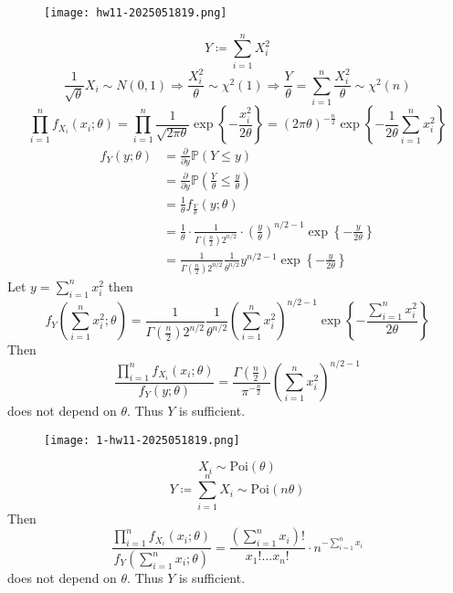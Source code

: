 \begin{exercise}
\begin{figure}[H]
\centering
\texttt{[image: hw11-2025051819.png]}
\label{}
\end{figure}
\end{exercise}
\[
Y\coloneqq \sum_{i=1}^{n} X_i^2
\]
\[
\frac{1}{\sqrt{ \theta }}X_i\sim N(0,1)\Rightarrow\frac{X_i^2}{\theta}\sim \chi^{2}(1)\Rightarrow \frac{Y}{\theta}=\sum_{i=1}^{n} \frac{X_i^2}{\theta}\sim \chi^{2}(n)
\]
\[
\prod_{i=1}^{n} f_{X_i}(x_i;\theta)=\prod_{i=1}^{n} \frac{1}{\sqrt{ 2\pi\theta }}\exp \left\{  -\frac{x_i^2}{2\theta}  \right\}=(2\pi\theta)^{-\frac{n}{2}}\exp \left\{  -\frac{1}{2\theta}\sum_{i=1}^{n} x_i^2  \right\}
\]
\[
\begin{aligned}
f_{Y}(y;\theta) & =\frac{ \partial   }{ \partial y } \mathbb{P}(Y\leq y) \\
 & =\frac{ \partial   }{ \partial y } \mathbb{P}\left( \frac{Y}{\theta}\leq \frac{y}{\theta} \right) \\
 & =\frac{1}{\theta}f_{\frac{Y}{\theta}}(y;\theta) \\
 & =\frac{1}{\theta}\cdot\frac{1}{\Gamma\left( \frac{n}{2} \right)2^{n/2}}\cdot \left( \frac{y}{\theta} \right)^{n/2-1}\exp \left\{  -\frac{y}{2\theta}  \right\} \\
 & =\frac{1}{\Gamma\left( \frac{n}{2} \right)2^{n/2 }}\frac{1}{\theta^{n/2 }}y^{n/2-1 }\exp \left\{  -\frac{y}{2\theta}  \right\}
\end{aligned}
\]
Let $y=\sum_{i=1}^{n}x_i^2$ then
\[
f_{Y}\left( \sum_{i=1}^{n} x_i^2 ;\theta\right)=\frac{1}{\Gamma\left( \frac{n}{2} \right)2^{n/2 }}\frac{1}{\theta^{n/2 }}\left( \sum_{i=1}^{n} x_i^2  \right)^{n/2-1 }\exp \left\{  -\frac{\sum_{i=1}^{n} x_i^2}{2\theta}  \right\}
\]
Then
\[
\frac{\prod_{i=1}^{n} f_{X_i}(x_i;\theta)}{f_{Y}(y;\theta)}=\frac{\Gamma\left( \frac{n}{2} \right)}{\pi^{-\frac{n}{2}}}\left( \sum_{i=1}^{n} x_i^2 \right)^{n/2-1}
\]
does not depend on $\theta$. Thus $Y$ is sufficient.

\begin{exercise}
\begin{figure}[H]
\centering
\texttt{[image: 1-hw11-2025051819.png]}
\label{}
\end{figure}
\end{exercise}
\[
X_i\sim \text{Poi}(\theta)
\]
\[
Y\coloneqq \sum_{i=1}^{n} X_i\sim \text{Poi}(n\theta)
\]
Then
\[
\frac{\prod_{i=1}^{n} f_{X_i}(x_i;\theta)}{f_{Y}\left( \sum_{i=1}^{n} x_i;\theta \right)}=\frac{\left( \sum_{i=1}^{n} x_i \right)!}{x_1!\dots x_n!}\cdot n^{-\sum_{i=1}^{n} x_i}
\]
does not depend on $\theta$. Thus $Y$ is sufficient.

